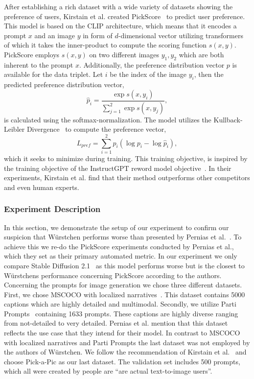 After establishing a rich dataset with a wide variety of datasets showing the
preference of users, Kirstain et al. created PickScore~\cite{kirstain2023pickapic}
to predict user preference. This model is based on the CLIP architecture, which
means that it encodes a prompt $x$ and an image $y$ in form of $d$-dimensional
vector utilizing transformers of which it takes the inner-product to compute the scoring function
$s(x, y)$. PickScore employs $s(x, y)$ on two different images $y_1, y_2$ which
are both inherent to the prompt $x$. Additionally, the preference distribution
vector $p$ is available for the data triplet. Let $i$ be the index of the image
$y_i$, then the predicted preference distribution vector,
\begin{equation}
    \hat{p}_i = \frac{\exp s(x, y_i)}{\sum_{j=1}^{2}\exp s(x, y_j)},
\end{equation}
is calculated using the softmax-normalization. The model utilizes the
Kullback-Leibler Divergence~\cite{kullback1951OnInformationandSufficiency} to compute the preference vector,
\begin{equation}
    L_{pref} = \sum_{i=1}^{2} p_i (\log p_i - \log\hat{p}_i),
\end{equation}
which it seeks to minimize during training. This training objective, is inspired
by the training objective of the InstructGPT reword model
objective~\cite{Ouyang2024InstructGPT}. In their experiments, Kirstain et al.
find that their method outperforms other competitors and even human experts.

\subsubsection{Experiment Description}
In this section, we demonstrate the setup of our experiment to confirm our
suspicion that W\"urstchen performs worse than presented by Pernias et
al.~\cite{pernias2024wrstchen}. To achieve this we re-do the PickScore
experiments conducted by Pernias et al., which they set as their primary
automated metric. In our experiment we only compare Stable Diffusion
2.1~\cite{rombach2023sd_2_1} as this model performs worse but is the closest to
W\"urstchens performance concerning PickScore according to the authors. \\

Concerning the prompts for image generation we chose three different datasets.
First, we chose MSCOCO with localized narratives~\cite{PontTuset2020LocalizedNarratives}.
This dataset contains 5000 captions which are highly detailed and multimodal.
Secondly, we utilize Parti Prompts~\cite{yu2022scalingautoregressivemodelscontentrich}
containing 1633 prompts. These captions are highly diverse ranging from
not-detailed to very detailed. Pernias et al. mention that this dataset reflects
the use case that they intend for their model. In contrast to MSCOCO with
localized narratives and Parti Prompts the last dataset was not employed by the
authors of W\"urstchen. We follow the recommendation of Kirstain et
al.~\cite{kirstain2023pickapic} and choose Pick-a-Pic as our last dataset. The
validation set includes 500 prompts, which all were created by people are
``are actual text-to-image users''\cite{kirstain2023pickapic}.\\

